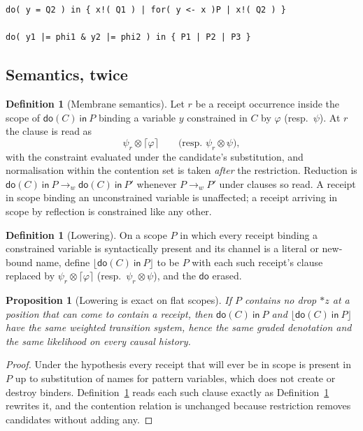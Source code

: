 \documentclass[11pt,a4paper]{article}
\theoremstyle{plain}
\newtheorem{proposition}[theorem]{Proposition}
\theoremstyle{definition}
\newtheorem{definition}[theorem]{Definition}
\theoremstyle{remark}
\newcommand{\tensorv}{\otimes}
\newcommand{\crisp}[1]{\lceil #1 \rceil}
\newcommand{\dok}{\textsf{do}}
\newcommand{\ink}{\textsf{in}}
\begin{document}
\begin{lstlisting}
do( y = Q2 ) in { x!( Q1 ) | for( y <- x )P | x!( Q2 ) }

do( y1 |= phi1 & y2 |= phi2 ) in { P1 | P2 | P3 }
\end{lstlisting}

\subsection{Semantics, twice}

\begin{definition}[Membrane semantics]\label{def:membrane}
Let $r$ be a receipt occurrence inside the scope of $\dok(C)\ \ink\ P$ binding a
variable $y$ constrained in $C$ by $\varphi$ (resp.\ $\psi$). At $r$ the
clause is read as
\[
  \psi_r \tensorv \crisp{\varphi} \qquad\text{(resp. } \psi_r \tensorv \psi
  \text{)},
\]
with the constraint evaluated under the candidate's substitution, and
normalisation within the contention set is taken \emph{after} the restriction.
Reduction is $\dok(C)\ \ink\ P \longrightarrow_w \dok(C)\ \ink\ P'$ whenever
$P \longrightarrow_w P'$ under clauses so read. A receipt in scope binding an
unconstrained variable is unaffected; a receipt arriving in scope by reflection
is constrained like any other.
\end{definition}

\begin{definition}[Lowering]\label{def:lowering}
On a scope $P$ in which every receipt binding a constrained variable is
syntactically present and its channel is a literal or \textsf{new}-bound name,
define $\lfloor \dok(C)\ \ink\ P \rfloor$ to be $P$ with each such receipt's
clause replaced by $\psi_r \tensorv \crisp{\varphi}$ (resp.\ $\psi_r \tensorv
\psi$), and the $\dok$ erased.
\end{definition}

\begin{proposition}[Lowering is exact on flat scopes]\label{prop:lowering}
If $P$ contains no drop $*z$ at a position that can come to contain a receipt,
then $\dok(C)\ \ink\ P$ and $\lfloor \dok(C)\ \ink\ P \rfloor$ have the same
weighted transition system, hence the same graded denotation and the same
likelihood on every causal history.
\end{proposition}

\begin{proof}
Under the hypothesis every receipt that will ever be in scope is present in $P$
up to substitution of names for pattern variables, which does not create or
destroy binders. Definition~\ref{def:membrane} reads each such clause exactly as
Definition~\ref{def:lowering} rewrites it, and the contention relation is
unchanged because restriction removes candidates without adding any.
\end{proof}
\end{document}

